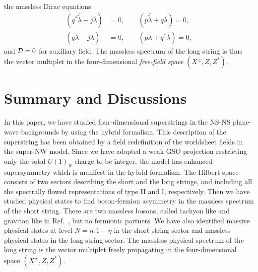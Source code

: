 \documentclass[a4paper,seceq,preprint]{ptptex}
\begin{document}
the massless Dirac equations
\begin{align}
(q^*\bar{\tilde\lambda}-j\bar\lambda)&=0,\qquad
(p\bar{\tilde\lambda}+q\bar\lambda)=0,\nonumber\\
(q\tilde\lambda-j\lambda)&=0,\qquad
(p\tilde\lambda+q^*\lambda)=0,
\end{align}
and ${\cal D}=0$ for auxiliary field.
The massless spectrum of the long string is thus 
the vector multiplet in the four-dimensional 
{\it free-field space} $(X^\pm,Z,Z^*)$.

\section{Summary and Discussions}\label{summary}

In this paper, we have studied four-dimensional superstrings
in the NS-NS plane-wave backgrounds by using the hybrid 
formalism. This description of the superstring has been 
obtained by a field redefinition of the worldsheet 
fields in the super-NW model.\cite{HS2}
Since we have adopted a weak GSO projection restricting only
the total $U(1)_R$ charge to be integer,
the model has enhanced supersymmetry which is manifest 
in the hybrid formalism. The Hilbert space consists of 
two sectors describing the short and the long strings,
and including all the spectrally flowed representations of 
type II and I, respectively.\cite{KK,KP} 
Then we have studied physical states to find boson-fermion 
asymmetry in the massless spectrum of the short string. 
There are two massless bosons, called tachyon like 
and graviton like in Ref.~, but no fermionic 
partners. We have also identified massive physical 
states at level $N=\eta, 1-\eta$ in the short string sector
and massless physical states in the long string sector. 
The massless physical spectrum of the long string is 
the vector multiplet freely propagating 
in the four-dimensional space $(X^\pm,Z,Z^*)$.
\end{document}
